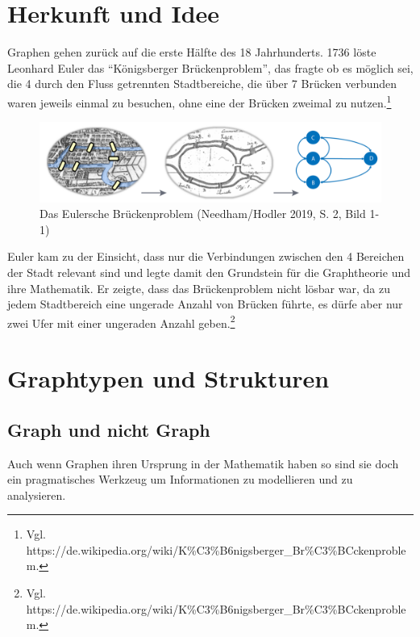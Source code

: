\documentclass[ngerman,]{scrreprt}
\begin{document}
\hypertarget{herkunft-und-idee}{%
\section{Herkunft und Idee}\label{herkunft-und-idee}}

Graphen gehen zurück auf die erste Hälfte des 18 Jahrhunderts. 1736 löste Leonhard Euler das ``Königsberger Brückenproblem'', das fragte ob es möglich sei, die 4 durch den Fluss getrennten Stadtbereiche, die über 7 Brücken verbunden waren jeweils einmal zu besuchen, ohne eine der Brücken zweimal zu nutzen.\footnote{Vgl. https://de.wikipedia.org/wiki/K\%C3\%B6nigsberger\_Br\%C3\%BCckenproblem.}

\begin{figure}
\centering
\includegraphics{Bilder/Eulersche-Bruecken.png}
\caption{Das Eulersche Brückenproblem (Needham/Hodler 2019, S. 2, Bild 1-1)}
\end{figure}

Euler kam zu der Einsicht, dass nur die Verbindungen zwischen den 4 Bereichen der Stadt relevant sind und legte damit den Grundstein für die Graphtheorie und ihre Mathematik. Er zeigte, dass das Brückenproblem nicht lösbar war, da zu jedem Stadtbereich eine ungerade Anzahl von Brücken führte, es dürfe aber nur zwei Ufer mit einer ungeraden Anzahl geben.\footnote{Vgl. https://de.wikipedia.org/wiki/K\%C3\%B6nigsberger\_Br\%C3\%BCckenproblem.}

\hypertarget{graphtypen-und-strukturen}{%
\section{Graphtypen und Strukturen}\label{graphtypen-und-strukturen}}

\hypertarget{graph-und-nicht-graph}{%
\subsection{Graph und nicht Graph}\label{graph-und-nicht-graph}}

Auch wenn Graphen ihren Ursprung in der Mathematik haben so sind sie doch ein pragmatisches Werkzeug um Informationen zu modellieren und zu analysieren.
\end{document}

